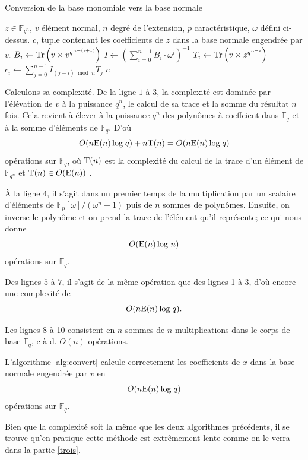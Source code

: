 \documentclass[a4paper]{article} %
\numberwithin{section}{part}
\numberwithin{equation}{section}
\newcommand\GF[1]{\mathbb{F}_{#1}}
\newcommand\Tr[1]{\textup{Tr}\left(#1\right)}
\newcommand\E[1]{\textup{E}(#1)}
\begin{document}
\begin{algorithm}
\caption{Conversion de la base monomiale vers la base normale}
\label{alg:convert}
\begin{algorithmic}[1]
\REQUIRE $z\in\GF{q^n}$, $v$ élément normal, $n$ degré de l'extension, $p$ 
caractéristique, $\omega$ défini ci-dessus.
\ENSURE $c$, tuple contenant les coefficients de $z$ dans la base 
normale engendrée par $v$.
\bigskip
{}
    \STATE $B_i \leftarrow \Tr{v\times v^{q^{n-(i+1)}}}$
\ENDFOR
\STATE $I \leftarrow (\sum_{i = 0}^{n-1}{B_i\cdot \omega^i})^{-1}$
    \STATE $T_i \leftarrow \Tr{v\times z^{q^{n-i}}}$
\ENDFOR
{}
    \STATE $c_i \leftarrow \sum_{j=0}^{n-1}{I_{(j-i)\bmod n}T_j}$
\ENDFOR
\RETURN $c$

\end{algorithmic}
\end{algorithm}
Calculons sa complexité. De la ligne $1$ à $3$, la complexité est dominée par 
l'élévation de $v$ à la puissance $q^n$, le calcul de sa trace et la somme du 
résultat $n$ fois. Cela revient à élever à la puissance $q^n$ des polynômes à 
coeffcient dans $\GF{q}$ et à la somme d'éléments de $\GF{q}$. D'où 
\begin{equation}
O(n\E{n}\,\textup{log}\;q) + n\textup{T}(n) = O(n\E{n}\,\textup{log}\;q) 
\end{equation}
opérations sur $\GF{q}$, où $\textup{T}(n)$ est la complexité du calcul de la 
trace d'un élément de $\GF{q^n}$ et $\textup{T}(n) \in O(\E{n})$ \cite[th.
7.9]{GaSho}.\par
À la ligne $4$, il s'agit dans un premier temps de la multiplication par un 
scalaire d'éléments de $\mathbb{F}_p[\omega]/(\omega^n - 1)$ puis de $n$ sommes 
de polynômes. Ensuite, on inverse le polynôme et on prend la trace de l'élément 
qu'il représente; ce qui nous donne 
\begin{equation}
O(\E{n}\,\textup{log }n)
\end{equation}
opérations sur $\GF{q}$.\par
Des lignes $5$ à $7$, il s'agit de la même opération que des lignes 1 à 3, d'où 
encore une complexité de 
\begin{equation}
O(n\E{n}\,\textup{log}\;q).
\end{equation}

Les lignes 8 à 10 consistent en $n$ sommes de $n$ multiplications dans le corps 
de base $\GF{q}$, c-à-d. $O(n)$ opérations.\par
\begin{prop}
\label{prop:algconvert}
L'algorithme \ref{alg:convert} calcule correctement les coefficients de $x$ dans
la base normale engendrée par $v$ en
\begin{equation}
O(n\E{n}\,\textup{log}\;q)
\end{equation}
opérations sur $\GF{q}$.
\end{prop}
\begin{rem}
Bien que la complexité soit la même que les deux algorithmes précédents, il se
trouve qu'en pratique cette méthode est extrêmement lente comme on le verra dans
la partie \ref{trois}.
\end{rem}
\end{document}
